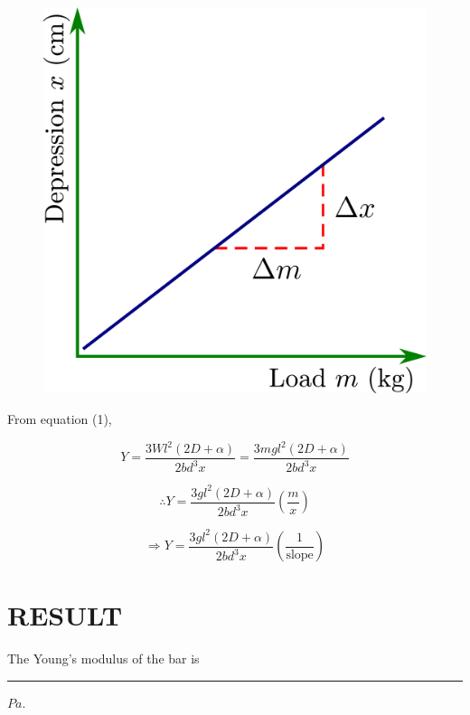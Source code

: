 \documentclass[12pt,a4paper]{article}
\begin{document}
			\begin{figure}[!htb]
				\centering
				\includegraphics[scale=1]{koenig-graph.png}
			\end{figure}
			
			From equation (1),
			
			$$Y = \dfrac{3Wl^2(2D+\alpha)}{2bd^3x} = \dfrac{3mgl^2(2D+\alpha)}{2bd^3x}$$
			
			$$\therefore Y = \dfrac{3gl^{2}\left(2D+\alpha\right)}{2bd^{3}x} \left(\dfrac{m}{x}\right)$$
			
			$$\Rightarrow Y=\dfrac{3gl^{2}\left(2D+\alpha\right)}{2bd^{3}x} \left(\dfrac{1}{\text{slope}}\right)$$
			
	
	\section{RESULT}
		The Young's modulus of the bar is \rule{20ex}{0.2pt}$Pa$.
			
\end{document}

